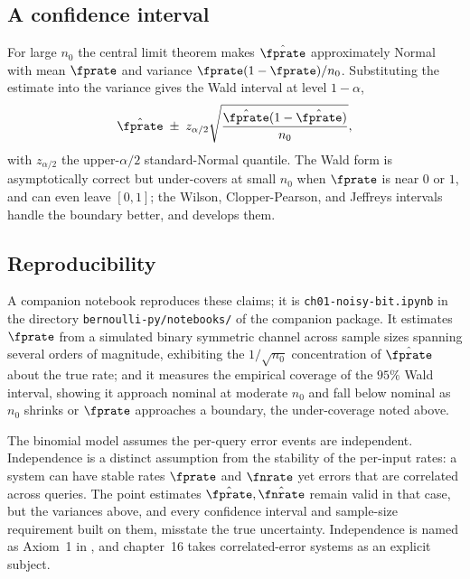 \subsection*{A confidence interval}

For large $n_0$ the central limit theorem makes $\hat{\fprate}$ approximately
Normal with mean $\fprate$ and variance $\fprate(1 - \fprate)/n_0$. Substituting
the estimate into the variance gives the Wald interval at level $1 - \alpha$,
\[
  \hat{\fprate} \;\pm\; z_{\alpha/2}
    \sqrt{\frac{\hat{\fprate}(1 - \hat{\fprate})}{n_0}},
\]
with $z_{\alpha/2}$ the upper-$\alpha/2$ standard-Normal quantile. The Wald form
is asymptotically correct but under-covers at small $n_0$ when $\fprate$ is near
$0$ or $1$, and can even leave $[0,1]$; the Wilson,
Clopper-Pearson, and Jeffreys
intervals handle the boundary better, and 
develops them.

\subsection*{Reproducibility}

A companion notebook reproduces these claims; it is
\texttt{ch01-noisy-bit.ipynb} in the directory \texttt{bernoulli-py/notebooks/}
of the companion package. It estimates $\fprate$ from a simulated binary
symmetric channel across sample sizes spanning several orders of magnitude,
exhibiting the $1/\sqrt{n_0}$ concentration of $\hat{\fprate}$ about the true
rate; and it measures the empirical coverage of the $95\%$ Wald interval,
showing it approach nominal at moderate $n_0$ and fall below nominal as $n_0$
shrinks or $\fprate$ approaches a boundary, the under-coverage noted above.

\begin{remark}
\label{rem:independence-vs-stability}
The binomial model assumes the per-query error events are independent.
Independence is a distinct assumption from the stability of the per-input
rates: a system can have stable rates $\fprate$ and $\fnrate$ yet errors that
are correlated across queries. The point estimates $\hat{\fprate},
\hat{\fnrate}$ remain valid in that case, but the variances above, and every
confidence interval and sample-size requirement built on them, misstate the
true uncertainty. Independence is named as Axiom~1 in
, and chapter~16 takes correlated-error systems as an
explicit subject.
\end{remark}
